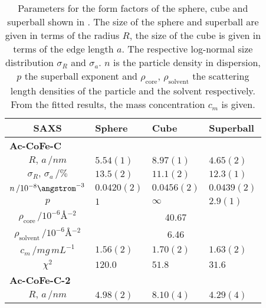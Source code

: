 \documentclass[\main/dresen_thesis.tex]{subfiles}
\begin{document}
    \begin{table}[!htbp]
      \centering
      \caption{\label{tab:monolayers:nanoparticle:saxs:shapeModelStudy}Parameters for the form factors of the sphere, cube and superball shown in .
      The size of the sphere and superball are given in terms of the radius $R$, the size of the cube is given in terms of the edge length $a$.
      The respective log-normal size distribution $\sigma_R$ and $\sigma_a$. $n$ is the particle density in dispersion, $p$ the superball exponent and $\rho_\mathrm{core}$, $\rho_\mathrm{solvent}$ the scattering length densities of the particle and the solvent respectively. From the fitted results, the mass concentration $c_m$ is given.}
      \begin{tabular}{ c | l | l | l }
        \textbf{SAXS}  & \textbf{Sphere} & \textbf{Cube} & \textbf{Superball}\\
        \hline
          \multicolumn{4}{l}{\textbf{Ac-CoFe-C}}\\
        \hline
        \rule{0pt}{2ex} $R, \, a \, / \unit{nm}$                      & $5.54(1)$      & $8.97(1)$  & $4.65(2)$\\
        \rule{0pt}{2ex} $\sigma_R, \, \sigma_a \, / \unit{\%}$        & $13.5(2)$      & $11.1(2)$  & $12.3(1)$\\
        \rule{0pt}{2ex} $n \, / 10^{-8} \angstrom^{-3}$               & $0.0420(2)$    & $0.0456(2)$& $0.0439(2)$\\
        \rule{0pt}{2ex} $p$                                           & $1$            & $\infty$   & $2.9(1)$\\
        \hline
        \rule{0pt}{2ex} $\rho_\mathrm{core}    \, / \unit{10^{-6} \angstrom^{-2}}$     & \multicolumn{3}{c}{40.67}\\
        \rule{0pt}{2ex} $\rho_\mathrm{solvent} \, / \unit{10^{-6} \angstrom^{-2}}$     & \multicolumn{3}{c}{6.46}\\
        \hline
        \rule{0pt}{2ex} $c_m \, / \unit{mg\, mL^{-1}}$                & $1.56(2)$      & $1.70(2)$  & $1.63(2)$\\
        \hline
        \rule{0pt}{2ex} $\chi^2$                                      & $120.0$        & $51.8$     & $31.6$\\
        \hline
        \hline
        \multicolumn{4}{l}{\textbf{Ac-CoFe-C-2}}\\
        \hline
        \rule{0pt}{2ex} $R, \, a \, / \unit{nm}$                      & $4.98(2)$      & $8.10(4)$  & $4.29(4)$\\

\end{tabular}
\end{table}
\end{document}
